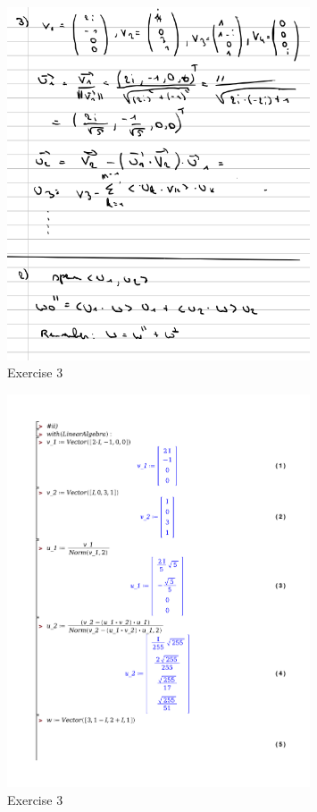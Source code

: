 \documentclass[a4paper]{report}
\begin{document}
\begin{figure}[!htbp]
	\centering
	\includegraphics[width=0.8\textwidth]{images/wc1_a3.png}
	\caption{Exercise 3}
\end{figure}

\begin{figure}[!htbp]
	\centering
	\includegraphics[width=0.8\textwidth]{./exercises/wc_1_ex_3.pdf}
	\caption{Exercise 3}
\end{figure}
\end{document}
